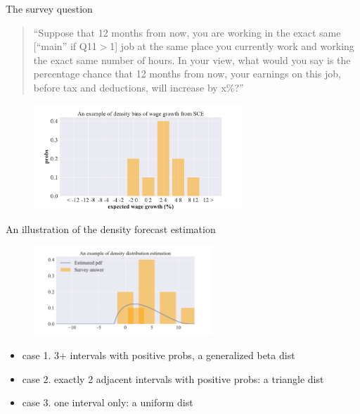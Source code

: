 \documentclass{beamer}
\begin{document}
\begin{frame}{The survey question}
	
	\begin{quote}
“Suppose that 12 months from now, you are working in the exact same [“main” if Q11$>$1] job at the same place you currently work and working the exact same number of hours. In your view, what would you say is the percentage chance that 12 months from now, your earnings on this job, before tax and deductions, will increase by x\%?”	
\end{quote}

	\begin{figure}
	\centering
	\label{fig: survey_question_illutration}
	\includegraphics[width=0.7\textwidth]{figures/density_bin_example.pdf}
\end{figure}
\end{frame}



\begin{frame}{An illustration of the density forecast estimation}
	\begin{figure}
		\centering
		\label{fig: dens_est_illutration}
		\includegraphics[width=0.6\textwidth]{figures/density_bin_est_example.pdf}
	\end{figure}
	
	\begin{itemize}
		\item  case 1. 3+ intervals with positive probs, a generalized beta dist
		\item case 2. exactly 2 adjacent intervals with positive probs: a triangle dist 
		\item case 3. one interval only: a uniform dist
	\end{itemize}
	
\end{frame}
\end{document}
